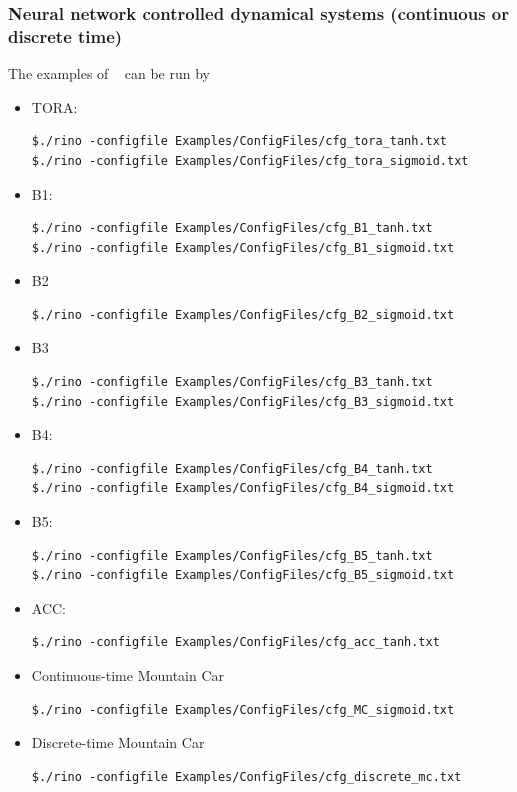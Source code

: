 \documentclass{article}
\begin{document}
\subsubsection{Neural network controlled dynamical systems (continuous or discrete time) \label{nnex}}
The  examples of ~\cite{cav22} can be run by
\begin{itemize}[noitemsep]
\item TORA:
\begin{verbatim}
$./rino -configfile Examples/ConfigFiles/cfg_tora_tanh.txt
$./rino -configfile Examples/ConfigFiles/cfg_tora_sigmoid.txt
\end{verbatim}
\item B1:
\begin{verbatim}
$./rino -configfile Examples/ConfigFiles/cfg_B1_tanh.txt
$./rino -configfile Examples/ConfigFiles/cfg_B1_sigmoid.txt
\end{verbatim}
\item B2
\begin{verbatim}
$./rino -configfile Examples/ConfigFiles/cfg_B2_sigmoid.txt
\end{verbatim}
\item B3
\begin{verbatim}
$./rino -configfile Examples/ConfigFiles/cfg_B3_tanh.txt
$./rino -configfile Examples/ConfigFiles/cfg_B3_sigmoid.txt
\end{verbatim}
\item B4:
\begin{verbatim}
$./rino -configfile Examples/ConfigFiles/cfg_B4_tanh.txt
$./rino -configfile Examples/ConfigFiles/cfg_B4_sigmoid.txt
\end{verbatim}
\item B5:
\begin{verbatim}
$./rino -configfile Examples/ConfigFiles/cfg_B5_tanh.txt
$./rino -configfile Examples/ConfigFiles/cfg_B5_sigmoid.txt
\end{verbatim}
\item ACC:
\begin{verbatim}
$./rino -configfile Examples/ConfigFiles/cfg_acc_tanh.txt
\end{verbatim}
\item Continuous-time Mountain Car
\begin{verbatim}
$./rino -configfile Examples/ConfigFiles/cfg_MC_sigmoid.txt
\end{verbatim}
\item Discrete-time Mountain Car
\begin{verbatim}
$./rino -configfile Examples/ConfigFiles/cfg_discrete_mc.txt
\end{verbatim}
\end{itemize}
\end{document}
